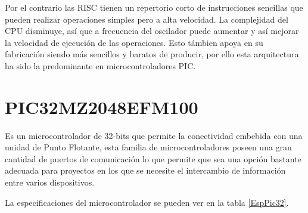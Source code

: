 \documentclass[letterpaper,12pt,oneside]{book}
\begin{document}
			Por el contrario las RISC tienen un repertorio corto de instrucciones sencillas que pueden realizar operaciones simples pero a alta velocidad. La complejidad del CPU disminuye, así que a frecuencia del oscilador puede aumentar y así mejorar la velocidad de ejecución de las operaciones. Esto támbien apoya en su fabricación siendo más sencillos y baratos de producir, por ello esta arquitectura ha sido la predominante en microcontroladores PIC.

		\section{PIC32MZ2048EFM100}
		Es un microcontrolador de 32-bits que permite la conectividad embebida con una unidad de Punto Flotante, esta familia de microcontroladores poseen una gran cantidad de puertos de comunicación lo que permite que sea una opción bastante adecuada para proyectos en los que se necesite el intercambio de información entre varios dispositivos.\cite{PIC32MZ}

		La especificaciones del microcontrolador se pueden ver en la tabla \ref{EspPic32}.

		\newpage
\end{document}
